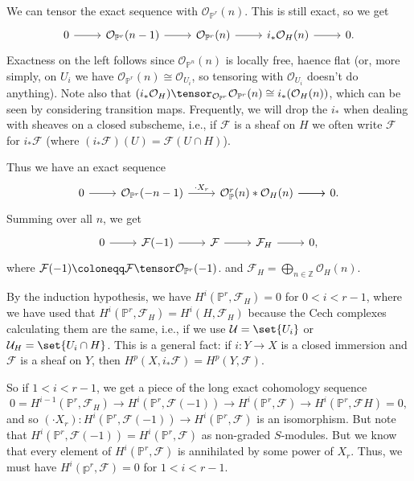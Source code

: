 We can tensor the exact sequence with $\mathcal{O}_{\mathbb{P}^r}(n)$. This is still exact,
so we get
\[\begin{tikzcd}
	0\ar[r] & \mathcal{O}_{\mathbb{P}^r}(n-1)\ar[r] & \mathcal{O}_{\mathbb{P}^r}(n) \ar[r] & i_*\mathcal{O}_H(n)\ar[r] & 0.
\end{tikzcd}\]
Exactness on the left follows since $\mathcal{O}_{\mathbb{P}^n}(n)$ is locally free, haence flat
(or, more simply, on $U_i$ we have $\mathcal{O}_{\mathbb{P}^r}(n)\cong \mathcal{O}_{U_i}$, so tensoring with
$\mathcal{O}_{U_i}$ doesn't do anything). Note also that $(i_*\mathcal{O}_H)\tensor_{\mathcal{O}_{\mathbb{P}^r}}\mathcal{O}_{\mathbb{P}^r}(n)\cong i_*(\mathcal{O}_H(n))$,
which can be seen by considering transition maps. Frequently, we will drop the $i_*$ when
dealing with sheaves on a closed subscheme, i.e., if $\mathcal{F}$ is a sheaf on $H$ we
often write $\mathcal{F}$ for $i_*\mathcal{F}$ (where $(i_*\mathcal{F})(U) = \mathcal{F}(U\cap H)$).

Thus we have an exact sequence
\[\begin{tikzcd}
	0\ar[r] & \mathcal{O}_{\mathbb{P}^r}(-n-1)\ar[r, "\cdot X_r"] & \mathcal{O}_\mathbb{P}^r(n)\ar[r] * \mathcal{O}_H(n)\ar[r] & 0.
\end{tikzcd}\]
Summing over all $n$, we get
\[\begin{tikzcd}
	0\ar[r] & \mathcal{F}(-1)\ar[r] & \mathcal{F}\ar[r] & \mathcal{F}_H\ar[r] & 0,
\end{tikzcd}\]
where $\mathcal{F}(-1)\coloneqq \mathcal{F}\tensor \mathcal{O}_{\mathbb{P}^r}(-1)$. and
$\mathcal{F}_H = \bigoplus_{n \in\mathbb{Z}} \mathcal{O}_H(n)$.

By the induction hypothesis, we have $H^i(\mathbb{P}^r, \mathcal{F}_H) = 0$ for
$0 < i < r-1$, where we have used that $H^i(\mathbb{P}^r, \mathcal{F}_H) = H^i(H, \mathcal{F}_H)$
because the Cech complexes calculating them are the same, i.e., if we use
$\mathcal{U} = \set{U_i}$ or $\mathcal{U}_H = \set{U_i \cap H}$. This is a general fact:
if $i\colon Y\to X$ is a closed immersion and $\mathcal{F}$ is a sheaf on $Y$, then
$H^p(X, i_*\mathcal{F}) = H^p(Y, \mathcal{F})$.


So if $1 < i < r-1$, we get a piece of the long exact cohomology sequence
\[ 0 = H^{i-1}(\mathbb{P}^r, \mathcal{F}_H)\to H^i(\mathbb{P}^r, \mathcal{F}(-1))\to H^i(\mathbb{P}^r, \mathcal{F}) \to H^i(\mathbb{P}^r, \mathcal{F}H) = 0, \]
and so $(\cdot X_r)\colon H^i(\mathbb{P}^r, \mathcal{F}(-1))\to H^i(\mathbb{P}^r, \mathcal{F})$ is
an isomorphism. But note that $H^i(\mathbb{P}^r, \mathcal{F}(-1)) = H^i(\mathbb{P}^r, \mathcal{F})$ as
non-graded $S$-modules. But we know that every element of $H^i(\mathbb{P}^r, \mathcal{F})$ is
annihilated by some power of $X_r$. Thus, we must have $H^i(\mathbb{p}^r, \mathcal{F}) = 0$ for
$1 < i < r-1$.

